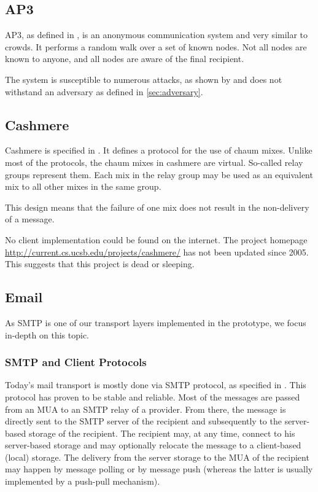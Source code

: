 \subsection{AP3}
AP3, as defined in \cite{mislove2004ap3}, is an anonymous communication system and very similar to crowds. It performs a random walk over a set of known nodes. Not all nodes are known to anyone, and all nodes are aware of the final recipient. 

The system is susceptible to numerous attacks, as shown by \cite{ccs2008:mittal} and does not withstand an adversary as defined in \ref{sec:adversary}.

\subsection{Cashmere}
Cashmere is specified in \cite{zhuang2005cashmere}. It defines a protocol for the use of chaum mixes. Unlike most of the protocols, the chaum mixes in cashmere are virtual. So-called relay groups represent them. Each mix in the relay group may be used as an equivalent mix to all other mixes in the same group. 

This design means that the failure of one mix does not result in the non-delivery of a message.

No client implementation could be found on the internet. The project homepage \href{http://current.cs.ucsb.edu/projects/cashmere/}{http://current.cs.ucsb.edu/projects/cashmere/} has not been updated since 2005. This suggests that this project is dead or sleeping.

\subsection{Email\label{sec:mailTransport}}
As SMTP is one of our transport layers implemented in the prototype, we focus in-depth on this topic.


\subsubsection{SMTP and Client Protocols}
Today's mail transport is mostly done via SMTP protocol, as specified in \cite{RFC5321}. This protocol has proven to be stable and reliable. Most of the messages are passed from an MUA to an SMTP relay of a provider. From there, the message is directly sent to the SMTP server of the recipient and subsequently to the server-based storage of the recipient. The recipient may, at any time, connect to his server-based storage and may optionally relocate the message to a client-based (local) storage. The delivery from the server storage to the MUA of the recipient may happen by message polling or by message push (whereas the latter is usually implemented by a push-pull mechanism).

